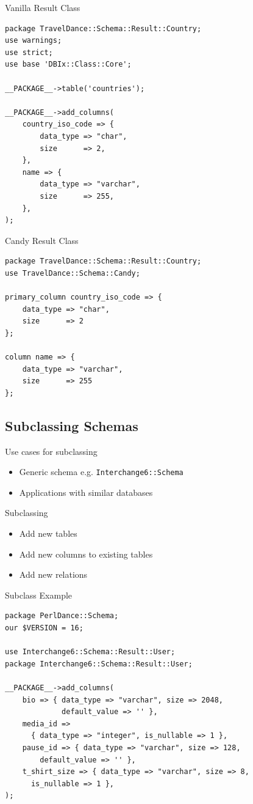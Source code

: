 \begin{frame}[fragile]{Vanilla Result Class}
\begin{lstlisting}
package TravelDance::Schema::Result::Country;
use warnings;
use strict;
use base 'DBIx::Class::Core';

__PACKAGE__->table('countries');

__PACKAGE__->add_columns(
    country_iso_code => {
        data_type => "char",
        size      => 2,
    },
    name => {
        data_type => "varchar",
        size      => 255,
    },
);
\end{lstlisting}
\end{frame}

\begin{frame}[fragile]{Candy Result Class}
\begin{lstlisting}
package TravelDance::Schema::Result::Country;
use TravelDance::Schema::Candy;

primary_column country_iso_code => {
    data_type => "char",
    size      => 2
};

column name => {
    data_type => "varchar",
    size      => 255
};
\end{lstlisting}
\end{frame}

\subsection{Subclassing Schemas}

\begin{frame}[fragile]{Use cases for subclassing}
\begin{itemize}
\item Generic schema e.g. \verb|Interchange6::Schema|
\item Applications with similar databases
\end{itemize}
\end{frame}

\begin{frame}{Subclassing}
\begin{itemize}
\item Add new tables
\item Add new columns to existing tables
\item Add new relations
\end{itemize}
\end{frame}

\begin{frame}[fragile]{Subclass Example}
\begin{lstlisting}
package PerlDance::Schema;
our $VERSION = 16;

use Interchange6::Schema::Result::User;
package Interchange6::Schema::Result::User;

__PACKAGE__->add_columns(
    bio => { data_type => "varchar", size => 2048, 
             default_value => '' },
    media_id =>
      { data_type => "integer", is_nullable => 1 },
    pause_id => { data_type => "varchar", size => 128, 
        default_value => '' },
    t_shirt_size => { data_type => "varchar", size => 8, 
      is_nullable => 1 },
);
\end{lstlisting}
\end{frame}

